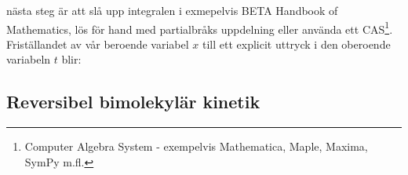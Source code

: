 nästa steg är att slå upp integralen i exmepelvis BETA Handbook of
Mathematics, lös för hand med partialbråks uppdelning  eller använda
ett CAS\footnote{  Computer Algebra System - exempelvis Mathematica,
  Maple, Maxima, SymPy m.fl.}. Friställandet av vår beroende variabel $x$
till ett explicit uttryck i den oberoende variabeln $t$ blir: 



\subsection{Reversibel bimolekylär kinetik}






